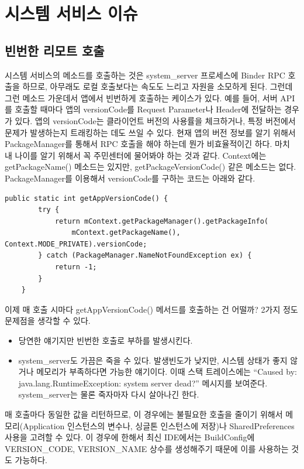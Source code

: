 \section{시스템 서비스 이슈}
\subsection{빈번한 리모트 호출}
시스템 서비스의 메소드를 호출하는 것은 system\_server 프로세스에 Binder RPC 호출을 하므로, 아무래도 로컬 호출보다는 속도도 느리고 자원을 소모하게 된다.
그런데 그런 메소드 가운데서 앱에서 빈번하게 호출하는 케이스가 있다.
예를 들어, 서버 API를 호출할 때마다 앱의 versionCode를 Request Parameter나 Header에 전달하는 경우가 있다. 
앱의 versionCode는 클라이언트 버전의 사용률을 체크하거나, 특정 버전에서 문제가 발생하는지 트래킹하는 데도 쓰일 수 있다.
현재 앱의 버전 정보를 알기 위해서 PackageManager를 통해서 RPC 호출을 해야 하는데 뭔가 비효율적이긴 하다. 
마치 내 나이를 알기 위해서 꼭 주민센터에 물어봐야 하는 것과 같다.
Context에는 getPackageName() 메소드는 있지만, getPackageVersionCode() 같은 메소드는 없다.\\

PackageManager를 이용해서 versionCode를 구하는 코드는 아래와 같다.
\begin{lstlisting}[frame=single]
	public static int getAppVersionCode() {
		try {
			return mContext.getPackageManager().getPackageInfo(
				mContext.getPackageName(), Context.MODE_PRIVATE).versionCode;
		} catch (PackageManager.NameNotFoundException ex) {
			return -1;
		}
	}
\end{lstlisting}

이제 매 호출 시마다 getAppVersionCode() 메서드를 호출하는 건 어떨까?
2가지 정도 문제점을 생각할 수 있다.
\begin{itemize}
\item 당연한 얘기지만 빈번한 호출로 부하를 발생시킨다.
\item system\_server도  가끔은 죽을 수 있다. 
발생빈도가 낮지만, 시스템 상태가 좋지 않거나 메모리가 부족하다면 가능한 얘기이다. 이때 스택 트레이스에는 ``Caused by: java.lang.RuntimeException: system server dead?'' 메시지를 보여준다. system\_server는 물론 죽자마자 다시 살아나긴 한다.
\end{itemize}

매 호출마다 동일한 값을 리턴하므로, 이 경우에는 불필요한 호출을 줄이기 위해서 메모리(Application 인스턴스의 변수나, 싱글톤 인스턴스에 저장)나 SharedPreferences 사용을 고려할 수 있다. 이 경우에 한해서 최신 IDE에서는 BuildConfig에 VERSION\_CODE, VERSION\_NAME 상수를 생성해주기 때문에 이를 사용하는 것도 가능하다.\\

